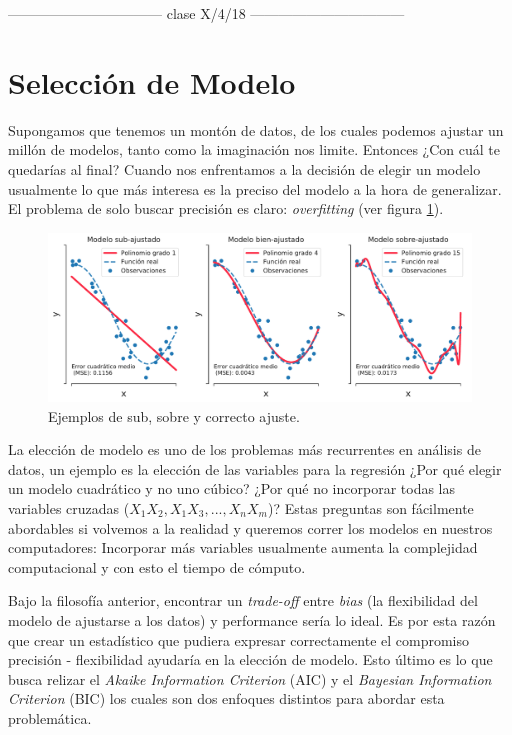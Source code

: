 
\newpage
\centerline{--------------------------------- clase X/4/18 ---------------------------------}
\section{Selección de Modelo}
Supongamos que tenemos un montón de datos, de los cuales podemos ajustar un millón de modelos, tanto como la imaginación nos limite. Entonces ¿Con cuál te quedarías al final?
Cuando nos enfrentamos a la decisión de elegir un modelo usualmente lo que más interesa es la preciso del modelo a la hora de generalizar. El problema de solo buscar precisión es claro: \emph{overfitting} (ver figura \ref{fig:overfitting}).
\begin{figure}[h!]
    \centering
    \includegraphics[width = 0.9\linewidth]{img/cap3_ajuste.pdf}
    \caption{Ejemplos de sub, sobre y correcto ajuste.}
    \label{fig:overfitting}
\end{figure}

La elección de modelo es uno de los problemas más recurrentes en análisis de datos, un ejemplo es la elección de las variables para la regresión ¿Por qué elegir un modelo cuadrático y no uno cúbico? ¿Por qué no incorporar todas las variables cruzadas ($X_1X_2, X_1X_3, ..., X_nX_m$)? Estas preguntas son fácilmente abordables si volvemos a la realidad y queremos correr los modelos en nuestros computadores: Incorporar más variables usualmente aumenta la complejidad computacional y con esto el tiempo de cómputo.

Bajo la filosofía anterior, encontrar un  \textit{trade-off} entre \emph{bias} (la flexibilidad del modelo de ajustarse a los datos) y performance sería lo ideal. Es por esta razón que crear un estadístico que pudiera expresar correctamente el compromiso precisión - flexibilidad ayudaría en la elección de modelo. Esto último es lo que busca relizar el \emph{Akaike Information Criterion} (AIC) y el \emph{Bayesian Information Criterion} (BIC) los cuales son dos enfoques distintos para abordar esta problemática.

